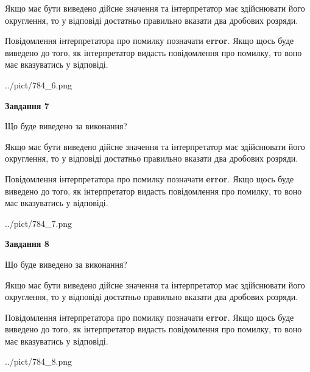 \documentclass[12pt, ukrainian]{article}
\begin{document}
{\begin {Large}
Якщо має бути виведено дійсне значення та інтерпретатор має здійснювати його округлення, 
то у відповіді достатньо правильно вказати два дробових розряди.

Повідомлення інтерпретатора про помилку позначати \textbf{error}.
Якщо щось буде виведено до того, як інтерпретатор видасть повідомлення про помилку, 
то воно має вказуватись у відповіді. \par

\begin{center}
	{../pict/784_6.png}
\end{center}
\newpage

{\begin {center}\textbf{Завдання 7}\end {center}}\par
Що буде виведено за виконання? \par

Якщо має бути виведено дійсне значення та інтерпретатор має здійснювати його округлення, 
то у відповіді достатньо правильно вказати два дробових розряди.

Повідомлення інтерпретатора про помилку позначати \textbf{error}.
Якщо щось буде виведено до того, як інтерпретатор видасть повідомлення про помилку, 
то воно має вказуватись у відповіді. \par

\begin{center}
	{../pict/784_7.png}
\end{center}
\newpage

{\begin {center}\textbf{Завдання 8}\end {center}}\par
Що буде виведено за виконання? \par

Якщо має бути виведено дійсне значення та інтерпретатор має здійснювати його округлення, 
то у відповіді достатньо правильно вказати два дробових розряди.

Повідомлення інтерпретатора про помилку позначати \textbf{error}.
Якщо щось буде виведено до того, як інтерпретатор видасть повідомлення про помилку, 
то воно має вказуватись у відповіді. \par

\begin{center}
	{../pict/784_8.png}
\end{center}
\newpage


\end{Large}}
\end{document}
